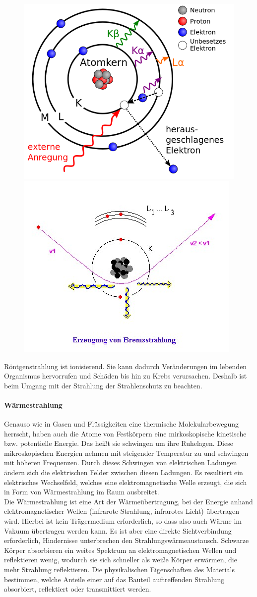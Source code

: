 				\begin{figure}[h]
					\centering
					\includegraphics[width=0.4\linewidth]{./pics/ph/roentgen.png}
					\includegraphics[width=0.4\linewidth]{./pics/ph/brems}
				\end{figure}
				Röntgenstrahlung ist ionisierend. Sie kann dadurch Veränderungen im lebenden Organismus hervorrufen und Schäden bis hin zu Krebs verursachen. Deshalb ist beim Umgang mit der Strahlung der Strahlenschutz zu beachten.
			\paragraph{Wärmestrahlung}	
				Genauso wie in Gasen und Flüssigkeiten eine thermische Molekularbewegung herrscht, haben auch die Atome von Festkörpern eine mirkoskopische kinetische bzw. potentielle Energie. Das heißt sie schwingen um ihre Ruhelagen. Diese mikroskopischen Energien nehmen mit steigender Temperatur zu und schwingen mit höheren Frequenzen. Durch dieses Schwingen von elektrischen Ladungen ändern sich die elektrischen Felder zwischen diesen Ladungen. Es resultiert ein elektrisches Wechselfeld, welches eine elektromagnetische Welle erzeugt, die sich in Form von Wärmestrahlung im Raum ausbreitet.\\
				Die Wärmestrahlung ist eine Art der Wärmeübertragung, bei der Energie anhand elektromagnetischer Wellen (infrarote Strahlung, infrarotes Licht) übertragen wird. Hierbei ist kein Trägermedium erforderlich, so dass also auch Wärme im Vakuum übertragen werden kann. Es ist aber eine direkte Sichtverbindung erforderlich, Hindernisse unterbrechen den Strahlungswärmeaustausch. Schwarze Körper absorbieren ein weites Spektrum an elektromagnetischen Wellen und reflektieren wenig, wodurch sie sich schneller als weiße Körper erwärmen, die mehr Strahlung reflektieren. Die physikalischen Eigenschaften des Materials bestimmen, welche Anteile einer auf das Bauteil auftreffenden Strahlung absorbiert, reflektiert oder transmittiert  werden.
			
